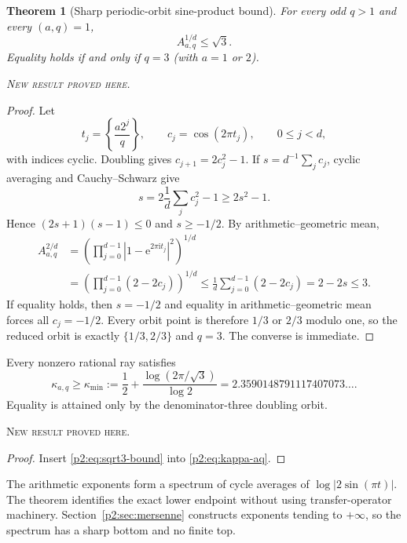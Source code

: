 \documentclass[11pt,oneside]{article}
\newtheorem{theorem}{Theorem}[section]
\theoremstyle{definition}
\theoremstyle{remark}
\newcommand{\e}{\mathrm e}
\newcommand{\ii}{\mathrm i}
\newcommand{\newresult}{\textcolor{newgreen}{\textsc{New result proved here.}}}
\begin{document}
\begin{theorem}[Sharp periodic-orbit sine-product bound]\label{p2:thm:sqrt3-bound}
For every odd $q>1$ and every $(a,q)=1$,
\begin{equation}
 \boxed{A_{a,q}^{1/d}\le\sqrt3.}
 \label{p2:eq:sqrt3-bound}
\end{equation}
Equality holds if and only if $q=3$ (with $a=1$ or $2$).

\smallskip\noindent\newresult
\end{theorem}

\begin{proof}
Let
\[
 t_j=\left\{\frac{a2^j}{q}\right\},\qquad
 c_j=\cos(2\pi t_j),\qquad0\le j<d,
\]
with indices cyclic. Doubling gives $c_{j+1}=2c_j^2-1$. If
$s=d^{-1}\sum_jc_j$, cyclic averaging and Cauchy--Schwarz give
\[
 s=2\frac1d\sum_jc_j^2-1\ge2s^2-1.
\]
Hence $(2s+1)(s-1)\le0$ and $s\ge-1/2$. By arithmetic--geometric mean,
\begin{align*}
 A_{a,q}^{2/d}
 &=\left(\prod_{j=0}^{d-1}|1-\e^{2\pi\ii t_j}|^2\right)^{1/d}\\
 &=\left(\prod_{j=0}^{d-1}(2-2c_j)\right)^{1/d}
 \le\frac1d\sum_{j=0}^{d-1}(2-2c_j)
 =2-2s\le3.
\end{align*}
If equality holds, then $s=-1/2$ and equality in arithmetic--geometric mean forces
all $c_j=-1/2$. Every orbit point is therefore $1/3$ or $2/3$ modulo one, so the
reduced orbit is exactly $\{1/3,2/3\}$ and $q=3$. The converse is immediate.
\end{proof}

\begin{corollary}\label{p2:cor:kappa-minimum}
Every nonzero rational ray satisfies
\begin{equation}
 \boxed{
 \kappa_{a,q}\ge\kappa_{\min}:=\frac12+\frac{\log(2\pi/\sqrt3)}{\log2}
 =2.3590148791117407073\ldots.}
 \label{p2:eq:kappa-minimum}
\end{equation}
Equality is attained only by the denominator-three doubling orbit.

\smallskip\noindent\newresult
\end{corollary}

\begin{proof}
Insert \eqref{p2:eq:sqrt3-bound} into \eqref{p2:eq:kappa-aq}.
\end{proof}

\begin{remark}
The arithmetic exponents form a spectrum of cycle averages of
$\log|2\sin(\pi t)|$. The theorem identifies the exact lower endpoint without
using transfer-operator machinery. Section~\ref{p2:sec:mersenne} constructs exponents
tending to $+\infty$, so the spectrum has a sharp bottom and no finite top.
\end{remark}
\end{document}
